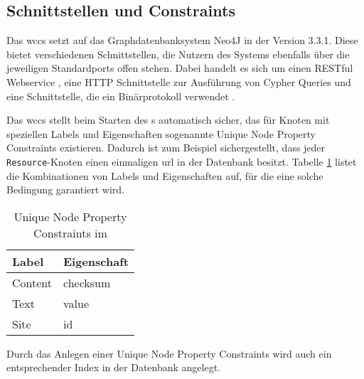 \subsection{Schnittstellen und Constraints}
    \label{section:solutionDetailsPersistenceDatabse}
    Das \gls{wccs} setzt auf das Graphdatenbanksystem Neo4J in der Version 3.3.1.
    Diese bietet verschiedenen Schnittstellen, die Nutzern des Systems ebenfalls über die jeweiligen Standardports offen stehen.
    Dabei handelt es sich um einen RESTful Webservice \cite{neo4j:restDocumentation},
    eine HTTP Schnittstelle zur Ausführung von Cypher Queries \cite[Kapitel 5]{neo4j:documentation}
    und eine Schnittstelle, die ein Binärprotokoll verwendet \cite[Kapitel 4]{neo4j:documentation}.

    Das \gls{wccs} stellt beim Starten des {\classificationStorage}s automatisch sicher,
    das für Knoten mit speziellen Labels und Eigenschaften sogenannte
    Unique Node Property Constraints
    \cite[Kapitel 3.5.2.2]{neo4j:documentation} existieren.
    Dadurch ist zum Beispiel sichergestellt,
    dass jeder \texttt{Resource}-Knoten einen einmaligen \gls{url} in der Datenbank besitzt.
    Tabelle \ref{table:solutionDetailsPersistenceDatabaseConstraints}
    listet die Kombinationen von Labels und Eigenschaften auf,
    für die eine solche Bedingung garantiert wird.

    \begin{table}[htb]
        \centering
        \begin{tabular}{|l|l|}
            \hline
            \textbf{Label} & \textbf{Eigenschaft} \\ \hline
            Content        & checksum             \\ \hline
            Text           & value                \\ \hline
            Site           & id                   \\ \hline
        \end{tabular}
        \caption{Unique Node Property Constraints im {\classificationStorage}}
        \label{table:solutionDetailsPersistenceDatabaseConstraints}
    \end{table}

    Durch das Anlegen einer Unique Node Property Constraints wird auch ein entsprechender Index in der Datenbank angelegt. 
